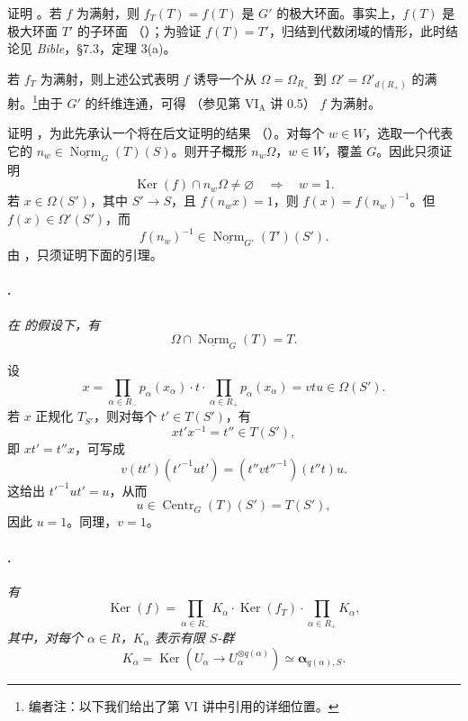 证明 \textup{}。若 \(f\) 为满射，则 \(f_T(T)=f(T)\) 是 \(G'\) 的极大环面。事实上，\(f(T)\) 是极大环面 \(T'\) 的子环面 \textup{（）}；为验证 \(f(T)=T'\)，归结到代数闭域的情形，此时结论见 \emph{Bible}，\S7.3，定理 3\textup{(a)}。

若 \(f_T\) 为满射，则上述公式表明 \(f\) 诱导一个从 \(\Omega=\Omega_{R_+}\) 到 \(\Omega'=\Omega'_{d(R_+)}\) 的满射。\footnote{编者注：以下我们给出了第 VI 讲中引用的详细位置。}由于 \(G'\) 的纤维连通，可得 \textup{（参见第 \(\mathrm{VI_A}\) 讲 0.5）} \(f\) 为满射。

证明 \textup{}，为此先承认一个将在后文证明的结果 \textup{（）}。对每个 \(w\in W\)，选取一个代表它的 \(n_w\in\underline{\operatorname{Norm}}_G(T)(S)\)。则开子概形 \(n_w\Omega\)，\(w\in W\)，覆盖 \(G\)。因此只须证明
\[
  \operatorname{Ker}(f)\cap n_w\Omega\ne\varnothing
  \quad\Longrightarrow\quad w=1.
\]
若 \(x\in\Omega(S')\)，其中 \(S'\to S\)，且 \(f(n_wx)=1\)，则 \(f(x)=f(n_w)^{-1}\)。但 \(f(x)\in\Omega'(S')\)，而
\[
  f(n_w)^{-1}\in
  \underline{\operatorname{Norm}}_{G'}(T')(S').
\]
由 ，只须证明下面的引理。

\paragraph{.}
\textit{在  的假设下，有}
\[
  \Omega\cap\underline{\operatorname{Norm}}_G(T)=T.
\]

设
\[
  x=
  \prod_{\alpha\in R_-}p_\alpha(x_\alpha)
  \mathbin{\cdot}t\mathbin{\cdot}
  \prod_{\alpha\in R_+}p_\alpha(x_\alpha)
  =
  vtu
  \in\Omega(S').
\]
若 \(x\) 正规化 \(T_{S'}\)，则对每个 \(t'\in T(S')\)，有
\[
  xt'x^{-1}=t''\in T(S'),
\]
即 \(xt'=t''x\)，可写成
\[
  v(tt')(t'^{-1}ut')
  =
  (t''vt''^{-1})(t''t)u.
\]
这给出 \(t'^{-1}ut'=u\)，从而
\[
  u\in\operatorname{Centr}_G(T)(S')=T(S'),
\]
因此 \(u=1\)。同理，\(v=1\)。

\paragraph{.}
\textit{有}
\[
  \operatorname{Ker}(f)
  =
  \prod_{\alpha\in R_-}K_\alpha
  \mathbin{\cdot}\operatorname{Ker}(f_T)\mathbin{\cdot}
  \prod_{\alpha\in R_+}K_\alpha,
\]
\textit{其中，对每个 \(\alpha\in R\)，\(K_\alpha\) 表示有限 \(S\)-群}
\[
  K_\alpha
  =
  \operatorname{Ker}\!\left(
    U_\alpha\longrightarrow U_\alpha^{\otimes q(\alpha)}
  \right)
  \simeq
  \boldsymbol{\alpha}_{q(\alpha),S}.
\]

